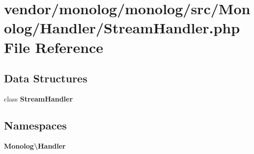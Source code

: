 \section{vendor/monolog/monolog/src/\+Monolog/\+Handler/\+Stream\+Handler.php File Reference}
\label{_stream_handler_8php}
\subsection*{Data Structures}
\begin{DoxyCompactItemize}
\item 
class {\bf Stream\+Handler}
\end{DoxyCompactItemize}
\subsection*{Namespaces}
\begin{DoxyCompactItemize}
\item 
 {\bf Monolog\textbackslash{}\+Handler}
\end{DoxyCompactItemize}
